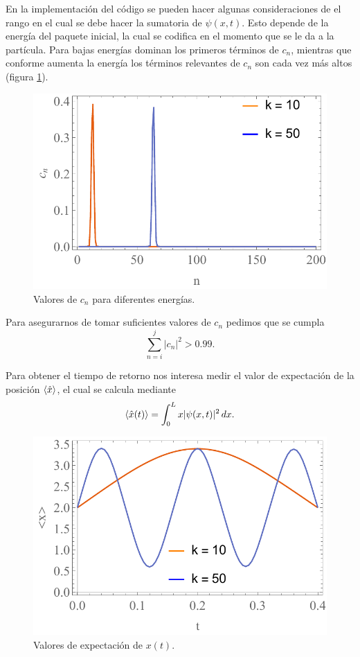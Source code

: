 \documentclass[letterpaper,11pt]{article}
\begin{document}
En la implementación del código se pueden  hacer algunas consideraciones de el rango en el cual se debe hacer la sumatoria de $\psi (x,t)$. Esto depende de la energía del paquete inicial, la cual se codifica en el momento que se le da a la partícula. Para bajas energías dominan los primeros términos de $c_n$, mientras que conforme aumenta la energía los términos relevantes de $c_n$ son cada vez más altos (figura \ref{fig:cn}).

\begin{figure}[h!]
\centering
\includegraphics[scale=0.55]{img/rt_coef}
\caption{Valores de $c_n$ para diferentes energías.}
\label{fig:cn}
\end{figure}

Para asegurarnos de tomar suficientes valores de $c_n$ pedimos que se cumpla
\[
	\sum_{n = i}^j |c_n|^2 > 0.99.
\]

Para obtener el tiempo de retorno nos interesa medir el valor de expectación de la posición $\braket{\hat{x}}$, el cual se calcula mediante
\[
	\braket{\hat{x}(t)} = \int_0^L x |\psi(x,t)|^2 \, dx.
\]

\begin{figure}[h!]
\centering
\includegraphics[scale=0.55]{img/rt_expect}
\caption{Valores de expectación de $x(t)$.}
\label{fig:expec}
\end{figure}
\end{document}
